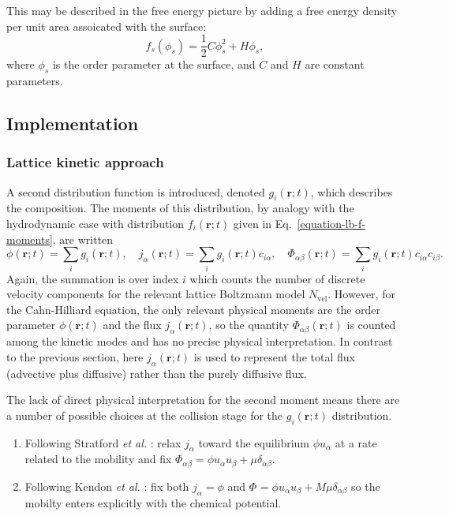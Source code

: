 This may be described in the free energy picture by adding a free
energy density per unit area assoicated with the surface:
\begin{equation}
f_s (\phi_s)= \textstyle{\frac{1}{2}} C \phi_s^2 + H \phi_s,
\end{equation}
where $\phi_s$ is the order parameter at the surface, and $C$ and $H$ are
constant parameters.

\subsection{Implementation}

\subsubsection{Lattice kinetic approach}

A second distribution function is introduced, denoted $g_i(\mathbf{r};t)$,
which describes the composition. The moments of this distribution, by
analogy with the hydrodynamic case with distribution
$f_i(\mathbf{r};t)$ given in
Eq.~\ref{equation-lb-f-moments}, are written
\begin{equation}
\phi(\mathbf{r};t) = \sum_i g_i (\mathbf{r};t), \quad
j_\alpha(\mathbf{r};t) = \sum_i g_i(\mathbf{r};t) c_{i\alpha}, \quad
\Phi_{\alpha\beta}(\mathbf{r};t) = \sum_i g_i(\mathbf{r};t)
c_{i\alpha}c_{i\beta}.
\end{equation}
Again, the summation is over index $i$ which counts the number of
discrete velocity components for the relevant lattice Boltzmann
model $N_{\mathrm{vel}}$. However, for the Cahn-Hilliard equation,
the only relevant physical moments are the order parameter
$\phi(\mathbf{r};t)$ and the flux $j_\alpha(\mathbf{r};t)$, so
the quantity $\Phi_{\alpha\beta}(\mathbf{r};t)$ is counted among
the kinetic modes and has no precise physical interpretation. In
contrast to the previous section, here $j_\alpha(\mathbf{r};t)$
is used to represent the total flux (advective
plus diffusive) rather than the purely diffusive flux.

The lack of direct physical interpretation for the second moment
means there are a number of possible choices at the collision
stage for the $g_i(\mathbf{r};t)$ distribution.
\begin{enumerate}
\item
Following Stratford \textit{et al.} \cite{j-stat-phys-2005}:
relax $j_\alpha$ toward the equilibrium $\phi u_\alpha$
at a rate related to the mobility and fix $\Phi_{\alpha\beta} =
\phi u_\alpha u_\beta + \mu \delta_{\alpha\beta}$.
\item
Following Kendon \textit{et al.} \cite{kendon2001}: fix both
$j_\alpha = \phi$ and
$\Phi_{} = \phi u_\alpha u_\beta + M\mu \delta_{\alpha\beta}$ so the
mobilty enters explicitly with the chemical potential.
\end{enumerate}


